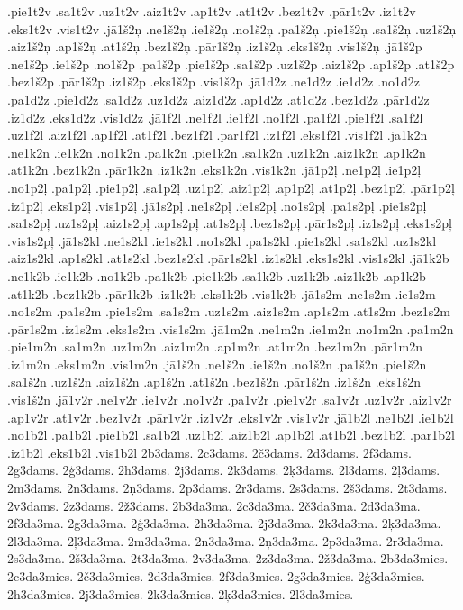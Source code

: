 {.pie1t2v
.sa1t2v
.uz1t2v
.aiz1t2v
.ap1t2v
.at1t2v
.bez1t2v
.pār1t2v
.iz1t2v
.eks1t2v
.vis1t2v
.jā1š2ņ
.ne1š2ņ
.ie1š2ņ
.no1š2ņ
.pa1š2ņ
.pie1š2ņ
.sa1š2ņ
.uz1š2ņ
.aiz1š2ņ
.ap1š2ņ
.at1š2ņ
.bez1š2ņ
.pār1š2ņ
.iz1š2ņ
.eks1š2ņ
.vis1š2ņ
.jā1š2p
.ne1š2p
.ie1š2p
.no1š2p
.pa1š2p
.pie1š2p
.sa1š2p
.uz1š2p
.aiz1š2p
.ap1š2p
.at1š2p
.bez1š2p
.pār1š2p
.iz1š2p
.eks1š2p
.vis1š2p
.jā1d2z
.ne1d2z
.ie1d2z
.no1d2z
.pa1d2z
.pie1d2z
.sa1d2z
.uz1d2z
.aiz1d2z
.ap1d2z
.at1d2z
.bez1d2z
.pār1d2z
.iz1d2z
.eks1d2z
.vis1d2z
.jā1f2l
.ne1f2l
.ie1f2l
.no1f2l
.pa1f2l
.pie1f2l
.sa1f2l
.uz1f2l
.aiz1f2l
.ap1f2l
.at1f2l
.bez1f2l
.pār1f2l
.iz1f2l
.eks1f2l
.vis1f2l
.jā1k2n
.ne1k2n
.ie1k2n
.no1k2n
.pa1k2n
.pie1k2n
.sa1k2n
.uz1k2n
.aiz1k2n
.ap1k2n
.at1k2n
.bez1k2n
.pār1k2n
.iz1k2n
.eks1k2n
.vis1k2n
.jā1p2ļ
.ne1p2ļ
.ie1p2ļ
.no1p2ļ
.pa1p2ļ
.pie1p2ļ
.sa1p2ļ
.uz1p2ļ
.aiz1p2ļ
.ap1p2ļ
.at1p2ļ
.bez1p2ļ
.pār1p2ļ
.iz1p2ļ
.eks1p2ļ
.vis1p2ļ
.jā1s2pļ
.ne1s2pļ
.ie1s2pļ
.no1s2pļ
.pa1s2pļ
.pie1s2pļ
.sa1s2pļ
.uz1s2pļ
.aiz1s2pļ
.ap1s2pļ
.at1s2pļ
.bez1s2pļ
.pār1s2pļ
.iz1s2pļ
.eks1s2pļ
.vis1s2pļ
.jā1s2kl
.ne1s2kl
.ie1s2kl
.no1s2kl
.pa1s2kl
.pie1s2kl
.sa1s2kl
.uz1s2kl
.aiz1s2kl
.ap1s2kl
.at1s2kl
.bez1s2kl
.pār1s2kl
.iz1s2kl
.eks1s2kl
.vis1s2kl
.jā1k2b
.ne1k2b
.ie1k2b
.no1k2b
.pa1k2b
.pie1k2b
.sa1k2b
.uz1k2b
.aiz1k2b
.ap1k2b
.at1k2b
.bez1k2b
.pār1k2b
.iz1k2b
.eks1k2b
.vis1k2b
.jā1s2m
.ne1s2m
.ie1s2m
.no1s2m
.pa1s2m
.pie1s2m
.sa1s2m
.uz1s2m
.aiz1s2m
.ap1s2m
.at1s2m
.bez1s2m
.pār1s2m
.iz1s2m
.eks1s2m
.vis1s2m
.jā1m2n
.ne1m2n
.ie1m2n
.no1m2n
.pa1m2n
.pie1m2n
.sa1m2n
.uz1m2n
.aiz1m2n
.ap1m2n
.at1m2n
.bez1m2n
.pār1m2n
.iz1m2n
.eks1m2n
.vis1m2n
.jā1š2n
.ne1š2n
.ie1š2n
.no1š2n
.pa1š2n
.pie1š2n
.sa1š2n
.uz1š2n
.aiz1š2n
.ap1š2n
.at1š2n
.bez1š2n
.pār1š2n
.iz1š2n
.eks1š2n
.vis1š2n
.jā1v2r
.ne1v2r
.ie1v2r
.no1v2r
.pa1v2r
.pie1v2r
.sa1v2r
.uz1v2r
.aiz1v2r
.ap1v2r
.at1v2r
.bez1v2r
.pār1v2r
.iz1v2r
.eks1v2r
.vis1v2r
.jā1b2l
.ne1b2l
.ie1b2l
.no1b2l
.pa1b2l
.pie1b2l
.sa1b2l
.uz1b2l
.aiz1b2l
.ap1b2l
.at1b2l
.bez1b2l
.pār1b2l
.iz1b2l
.eks1b2l
.vis1b2l
2b3dams.
2c3dams.
2č3dams.
2d3dams.
2f3dams.
2g3dams.
2ģ3dams.
2h3dams.
2j3dams.
2k3dams.
2ķ3dams.
2l3dams.
2ļ3dams.
2m3dams.
2n3dams.
2ņ3dams.
2p3dams.
2r3dams.
2s3dams.
2š3dams.
2t3dams.
2v3dams.
2z3dams.
2ž3dams.
2b3da3ma.
2c3da3ma.
2č3da3ma.
2d3da3ma.
2f3da3ma.
2g3da3ma.
2ģ3da3ma.
2h3da3ma.
2j3da3ma.
2k3da3ma.
2ķ3da3ma.
2l3da3ma.
2ļ3da3ma.
2m3da3ma.
2n3da3ma.
2ņ3da3ma.
2p3da3ma.
2r3da3ma.
2s3da3ma.
2š3da3ma.
2t3da3ma.
2v3da3ma.
2z3da3ma.
2ž3da3ma.
2b3da3mies.
2c3da3mies.
2č3da3mies.
2d3da3mies.
2f3da3mies.
2g3da3mies.
2ģ3da3mies.
2h3da3mies.
2j3da3mies.
2k3da3mies.
2ķ3da3mies.
2l3da3mies.
}
